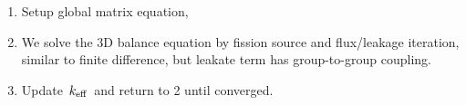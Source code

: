 \documentclass{school-22.211-notes}
\begin{document}
\begin{enumerate}
\item Setup global matrix equation,

\item We solve the 3D balance equation by fission source and flux/leakage iteration, similar to finite difference, but leakate term has group-to-group coupling. 

\item Update $\left. k_{\mathrm{eff}} \right.$ and return to 2 until converged. 
\end{enumerate}
\end{document}
